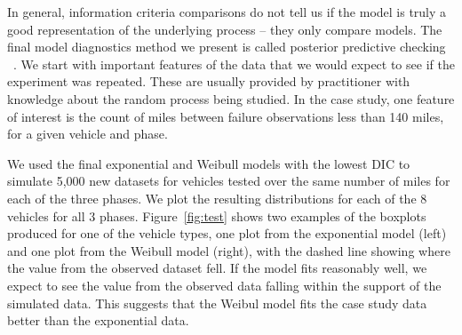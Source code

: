 \documentclass[12pt]{article}
\begin{document}
In general, information criteria
comparisons do not tell us if the model is truly a good representation of the
underlying process -- they only compare models. The final model diagnostics method we present is called
posterior predictive checking ~\cite{ref6}.  We start with important
features of the data that we would expect to see if the experiment was repeated.
These are usually provided by practitioner with knowledge about the random
process being studied. In the case study, one feature of interest is the count of miles between failure observations less than 140 miles, for a given vehicle and phase.

We used the final exponential and Weibull models with the lowest DIC to simulate 5,000 new datasets for vehicles tested over the same number of miles for each of the three phases. We plot the resulting distributions for each of the 8 vehicles for all 3 phases. Figure~\ref{fig:test} shows two examples of the boxplots produced for one of the vehicle types, one plot from the exponential model
(left) and one plot from the Weibull model (right), with the dashed line showing
where the value from the observed dataset fell. If the model fits reasonably well, we expect to see the value from the observed data falling within the support of the simulated data. This suggests that the Weibul model fits the case study data better than the exponential data.
\end{document}
